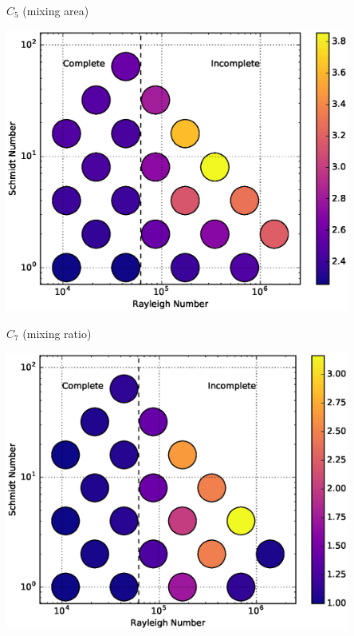 \documentclass[12pt]{beamer}
\begin{document}
\begin{frame}[t]{$C_5$ (mixing area)}
\begin{center}
\vspace{-11pt}
\includegraphics[width=0.85\textwidth]{graphics/C5-vs-Rayleigh-Schmidt.eps}
\end{center}
\end{frame}

\begin{frame}[t]{$C_7$ (mixing ratio)}
\begin{center}
\vspace{-11pt}
\includegraphics[width=0.85\textwidth]{graphics/C7-vs-Rayleigh-Schmidt.eps}
\end{center}
\end{frame}

\end{document}
